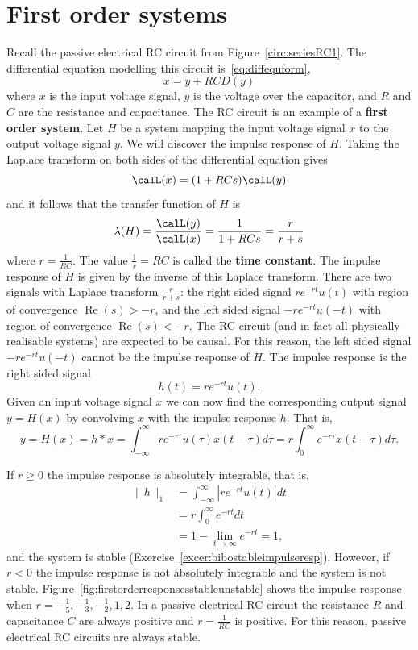 \documentclass[11pt,a4paper]{book}
\theoremstyle{plain}
\numberwithin{equation}{section}
\renewcommand{\Re}{\operatorname{Re}}
\newcommand{\term}{\textbf}
\newcommand{\abs}[1]{\left\vert #1 \right\vert}
\begin{document}
\section{First order systems}\label{sec:first-order-systems}

Recall the passive electrical RC circuit from Figure~\ref{circ:seriesRC1}.  The differential equation modelling this circuit is~\eqref{eq:diffequform},
\[
x = y + RC D(y)
\] 
where $x$ is the input voltage signal, $y$ is the voltage over the capacitor, and $R$ and $C$ are the resistance and capacitance.  The RC circuit is an example of a \term{first order system}.  Let $H$ be a system mapping the input voltage signal $x$ to the output voltage signal $y$.  We will discover the impulse response of $H$.  Taking the Laplace transform on both sides of the differential equation gives
\[
\calL(x) = (1 + RC s ) \calL(y)
\]
and it follows that the transfer function of $H$ is
\[
\lambda(H) = \frac{\calL(y)}{\calL(x)} = \frac{1}{1 + RC s} = \frac{r}{r + s}
\]
where $r = \tfrac{1}{RC}$.  The value $\tfrac{1}{r} = RC$ is called the \term{time constant}.  The impulse response of $H$ is given by the inverse of this Laplace transform.  There are two signals with Laplace transform $\frac{r}{r + s}$: the right sided signal $r e^{-r t} u(t)$ with region of convergence $\Re(s) > -r$, and the left sided signal $-r e^{-r t} u(-t)$ with region of convergence $\Re(s) < -r$.  The RC circuit (and in fact all physically realisable systems) are expected to be causal.  For this reason, the left sided signal $ -r e^{-r t} u(-t)$ cannot be the impulse response of $H$.  The impulse response is the right sided signal
\[
h(t) = r e^{-r t} u(t).
\]
Given an input voltage signal $x$ we can now find the corresponding output signal $y = H(x)$ by convolving $x$ with the impulse response $h$.  That is,
\[
y = H(x) = h * x = \int_{-\infty}^{\infty} r e^{-r \tau} u(\tau) x(t - \tau) d\tau = r \int_{0}^{\infty} e^{-r \tau} x(t - \tau) d\tau.
\] 

If $r \geq 0$ the impulse response is absolutely integrable, that is,
\begin{align*}
\|h\|_1 &= \int_{-\infty}^\infty \abs{r e^{-r t} u(t)} dt \\
&= r \int_{0}^\infty e^{-r t} dt \\
&= 1 - \lim_{t\to\infty} e^{-r t} = 1,
\end{align*}
and the system is stable (Exercise~\ref{excer:bibostableimpulseresp}).  However, if $r < 0$ the impulse response is not absolutely integrable and the system is not stable.  Figure~\ref{fig:firstorderresponsesstableunstable} shows the impulse response when $r=-\frac{1}{5}, -\tfrac{1}{3}, -\tfrac{1}{2}, 1, 2$.  In a passive electrical RC circuit the resistance $R$ and capacitance $C$ are always positive and $r=\tfrac{1}{RC}$ is positive. For this reason, passive electrical RC circuits are always stable.
\end{document}
